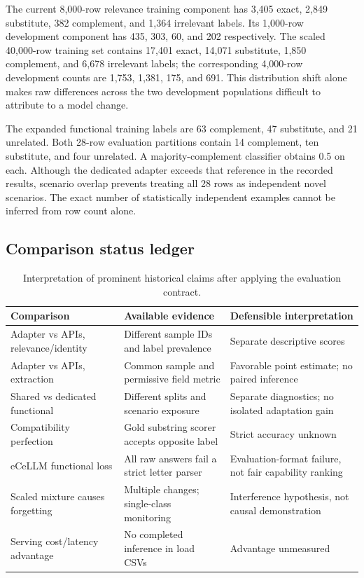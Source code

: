 The current 8,000-row relevance training component has 3,405 exact, 2,849 substitute, 382 complement, and 1,364 irrelevant labels. Its 1,000-row development component has 435, 303, 60, and 202 respectively. The scaled 40,000-row training set contains 17,401 exact, 14,071 substitute, 1,850 complement, and 6,678 irrelevant labels; the corresponding 4,000-row development counts are 1,753, 1,381, 175, and 691. This distribution shift alone makes raw differences across the two development populations difficult to attribute to a model change.

The expanded functional training labels are 63 complement, 47 substitute, and 21 unrelated. Both 28-row evaluation partitions contain 14 complement, ten substitute, and four unrelated. A majority-complement classifier obtains 0.5 on each. Although the dedicated adapter exceeds that reference in the recorded results, scenario overlap prevents treating all 28 rows as independent novel scenarios. The exact number of statistically independent examples cannot be inferred from row count alone.

\subsection{Comparison status ledger}
\begin{table}[h]
\centering\small
\caption{Interpretation of prominent historical claims after applying the evaluation contract.}
\begin{tabularx}{\textwidth}{P{3.4cm}YY}
\toprule
Comparison & Available evidence & Defensible interpretation \\
\midrule
Adapter vs APIs, relevance/identity & Different sample IDs and label prevalence & Separate descriptive scores \\
Adapter vs APIs, extraction & Common sample and permissive field metric & Favorable point estimate; no paired inference \\
Shared vs dedicated functional & Different splits and scenario exposure & Separate diagnostics; no isolated adaptation gain \\
Compatibility perfection & Gold substring scorer accepts opposite label & Strict accuracy unknown \\
eCeLLM functional loss & All raw answers fail a strict letter parser & Evaluation-format failure, not fair capability ranking \\
Scaled mixture causes forgetting & Multiple changes; single-class monitoring & Interference hypothesis, not causal demonstration \\
Serving cost/latency advantage & No completed inference in load CSVs & Advantage unmeasured \\
\bottomrule
\end{tabularx}
\end{table}

